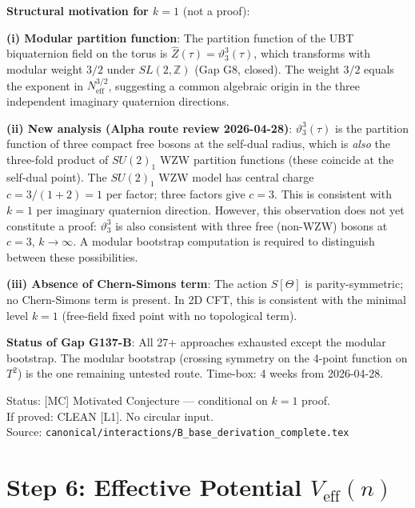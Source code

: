 \documentclass[12pt,a4paper]{article}
\theoremstyle{definition}
\theoremstyle{remark}
\begin{document}
\begin{insightbox}
\textbf{Structural motivation for $k = 1$} (not a proof):

\textbf{(i) Modular partition function}:
The partition function of the UBT biquaternion field on the torus is
$\hat{Z}(\tau) = \vartheta_3^3(\tau)$, which transforms with modular weight
$3/2$ under $SL(2,\mathbb{Z})$ (Gap G8, closed).  The weight $3/2$ equals
the exponent in $N_{\mathrm{eff}}^{3/2}$, suggesting a common algebraic origin
in the three independent imaginary quaternion directions.

\textbf{(ii) New analysis (Alpha route review 2026-04-28)}:
$\vartheta_3^3(\tau)$ is the partition function of three compact free bosons
at the self-dual radius, which is \emph{also} the three-fold product of
$SU(2)_1$ WZW partition functions (these coincide at the self-dual point).
The $SU(2)_1$ WZW model has central charge $c = 3/(1+2) = 1$ per factor;
three factors give $c = 3$.  This is consistent with $k = 1$ per imaginary
quaternion direction.  However, this observation does not yet constitute a proof:
$\vartheta_3^3$ is also consistent with three free (non-WZW) bosons at
$c = 3$, $k \to \infty$.  A modular bootstrap computation is required to
distinguish between these possibilities.

\textbf{(iii) Absence of Chern-Simons term}:
The action $S[\Theta]$ is parity-symmetric; no Chern-Simons term is present.
In 2D CFT, this is consistent with the minimal level $k = 1$ (free-field fixed
point with no topological term).

\medskip
\textbf{Status of Gap G137-B}: All 27+ approaches exhausted except the modular
bootstrap.  The modular bootstrap (crossing symmetry on the 4-point function
on $T^2$) is the one remaining untested route.  Time-box: 4 weeks from 2026-04-28.
\end{insightbox}

\begin{resultbox}
Status: [MC] Motivated Conjecture — conditional on $k = 1$ proof.\\
If proved: CLEAN [L1].  No circular input.\\
Source: \texttt{canonical/interactions/B\_base\_derivation\_complete.tex}
\end{resultbox}

\section{Step 6: Effective Potential $V_{\mathrm{eff}}(n)$}
\label{sec:ar:Veff}
\end{document}
